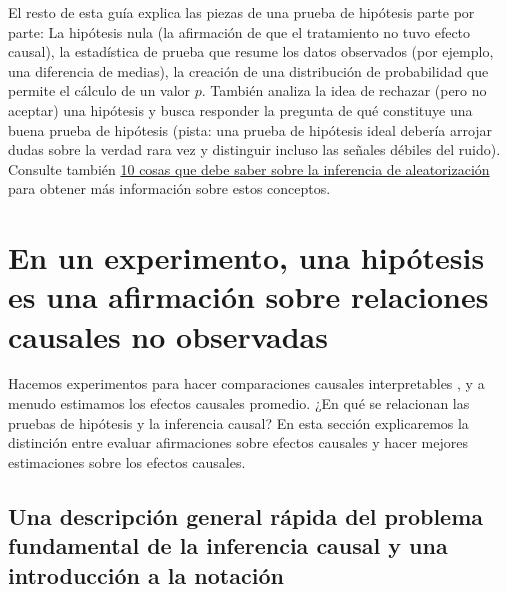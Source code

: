 \documentclass[
]{article}
\begin{document}
El resto de esta guía explica las piezas de una prueba de hipótesis parte por parte: La hipótesis nula (la afirmación de que el tratamiento no tuvo efecto causal), la estadística de prueba que resume los datos observados (por ejemplo, una diferencia de medias), la creación de una distribución de probabilidad que permite el cálculo de un valor \(p\). También analiza la idea de rechazar (pero no aceptar) una hipótesis y busca responder la pregunta de qué constituye una buena prueba de hipótesis (pista: una prueba de hipótesis ideal debería arrojar dudas sobre la verdad rara vez y distinguir incluso las señales débiles del ruido). Consulte también \href{https://egap.org/resource/10-things-to-know-about-randomization-inference}{10 cosas que debe saber sobre la inferencia de aleatorización} para obtener más información sobre estos conceptos.

\hypertarget{en-un-experimento-una-hipuxf3tesis-es-una-afirmaciuxf3n-sobre-relaciones-causales-no-observadas}{%
\section{En un experimento, una hipótesis es una afirmación sobre relaciones causales no observadas}\label{en-un-experimento-una-hipuxf3tesis-es-una-afirmaciuxf3n-sobre-relaciones-causales-no-observadas}}

Hacemos experimentos para hacer comparaciones causales interpretables
\autocite{kinder1993behalf}, y a menudo estimamos los efectos causales promedio. ¿En qué se relacionan las pruebas de hipótesis y la inferencia causal? En esta sección explicaremos la distinción entre evaluar afirmaciones sobre efectos causales y hacer mejores estimaciones sobre los efectos causales.

\hypertarget{una-descripciuxf3n-general-ruxe1pida-del-problema-fundamental-de-la-inferencia-causal-y-una-introducciuxf3n-a-la-notaciuxf3n}{%
\subsection{Una descripción general rápida del problema fundamental de la inferencia causal y una introducción a la notación}\label{una-descripciuxf3n-general-ruxe1pida-del-problema-fundamental-de-la-inferencia-causal-y-una-introducciuxf3n-a-la-notaciuxf3n}}
\end{document}
